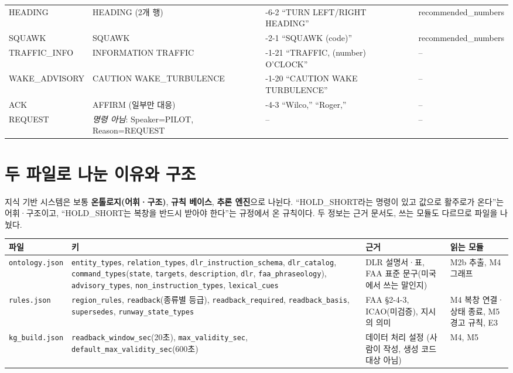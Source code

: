 \documentclass[10pt,a4paper]{article}
\newcommand{\cmd}[1]{\textsf{\small #1}}
\newcommand{\key}[1]{\texttt{\small #1}}
\begin{document}
\begin{center}
\begin{longtable}{@{}>{\raggedright\arraybackslash}p{3.3cm}>{\raggedright\arraybackslash}p{3.6cm}>{\raggedright\arraybackslash}p{5.0cm}>{\raggedright\arraybackslash}p{2.6cm}@{}}
\cmd{HEADING} & HEADING (2개 행) & 5-6-2 ``TURN LEFT/RIGHT HEADING'' & recommended\_\allowbreak numbers\\
\cmd{SQUAWK} & SQUAWK & 5-2-1 ``SQUAWK (code)'' & recommended\_\allowbreak numbers\\
\cmd{TRAFFIC\_INFO} & INFORMATION TRAFFIC & 2-1-21 ``TRAFFIC, (number) O'CLOCK'' & --\\
\cmd{WAKE\_ADVISORY} & CAUTION WAKE\_TURBULENCE & 2-1-20 ``CAUTION WAKE TURBULENCE'' & --\\
\cmd{ACK} & AFFIRM (일부만 대응) & 2-4-3 ``Wilco,'' ``Roger,'' & --\\
\cmd{REQUEST} & \textit{명령 아님}: Speaker=PILOT, Reason=REQUEST & -- & --\\
\bottomrule
\end{longtable}
\end{center}

\section{두 파일로 나눈 이유와 구조}\label{sec:split}
지식 기반 시스템은 보통 \textbf{온톨로지(어휘·구조)}, \textbf{규칙 베이스}, \textbf{추론 엔진}으로 나뉜다. ``HOLD\_SHORT라는 명령이 있고 값으로 활주로가 온다''는 어휘·구조이고, ``HOLD\_SHORT는 복창을 반드시 받아야 한다''는 규정에서 온 규칙이다. 두 정보는 근거 문서도, 쓰는 모듈도 다르므로 파일을 나눴다.

\begin{center}\small
\begin{tabularx}{\textwidth}{@{}l>{\raggedright\arraybackslash}X>{\raggedright\arraybackslash}p{2.6cm}>{\raggedright\arraybackslash}p{2.4cm}@{}}
\toprule
파일 & 키 & 근거 & 읽는 모듈\\\midrule
\texttt{ontology.json} & \key{entity\_types}, \key{relation\_types}, \key{dlr\_instruction\_schema}, \key{dlr\_catalog}, \key{command\_types}(\key{state}, \key{targets}, \key{description}, \key{dlr}, \key{faa\_phraseology}), \key{advisory\_types}, \key{non\_instruction\_types}, \key{lexical\_cues} & DLR 설명서·표, FAA 표준 문구(미국에서 쓰는 말인지) & M2b 추출, M4 그래프\\
\texttt{rules.json} & \key{region\_rules}, \key{readback}(종류별 등급), \key{readback\_required}, \key{readback\_basis}, \key{supersedes}, \key{runway\_state\_types} & FAA §2-4-3, ICAO(미검증), 지시의 의미 & M4 복창 연결·상태 종료, M5 경고 규칙, E3\\
\texttt{kg\_build.json} & \key{readback\_window\_sec}(20초), \key{max\_validity\_sec}, \key{default\_max\_validity\_sec}(600초) & 데이터 처리 설정 (사람이 작성, 생성 코드 대상 아님) & M4, M5\\
\bottomrule
\end{tabularx}
\end{center}
\end{document}
